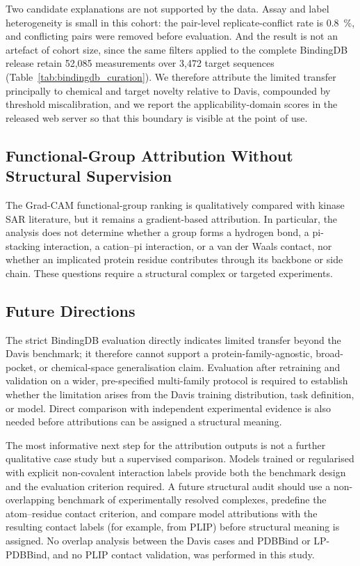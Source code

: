 \documentclass[fleqn,10pt]{wlscirep}
\begin{document}
Two candidate explanations are not supported by the data.  Assay and label
heterogeneity is small in this cohort: the pair-level replicate-conflict rate is
\SI{0.8}{\percent}, and conflicting pairs were removed before evaluation.  And
the result is not an artefact of cohort size, since the same filters applied to
the complete BindingDB release retain 52{,}085 measurements over 3{,}472 target
sequences (Table~\ref{tab:bindingdb_curation}).  We therefore attribute the
limited transfer principally to chemical and target novelty relative to Davis,
compounded by threshold miscalibration, and we report the applicability-domain
scores in the released web server so that this boundary is visible at the point
of use.

\subsection{Functional-Group Attribution Without Structural Supervision}

The Grad-CAM functional-group ranking is qualitatively compared with kinase
SAR literature, but it remains a gradient-based attribution.  In particular,
the analysis does not determine whether a group forms a hydrogen bond, a
pi-stacking interaction, a cation--pi interaction, or a van der Waals contact,
nor whether an implicated protein residue contributes through its backbone or
side chain.  These questions require a structural complex or targeted
experiments.\cite{zhang2009targeting}

\subsection{Future Directions}

The strict BindingDB evaluation directly indicates limited transfer beyond the
Davis benchmark; it therefore cannot support a protein-family-agnostic,
broad-pocket, or chemical-space generalisation claim.  Evaluation after
retraining and validation on a wider, pre-specified multi-family protocol is
required to establish whether the limitation arises from the Davis training
distribution, task definition, or model. Direct comparison with independent
experimental evidence is also needed before attributions can be assigned a
structural meaning.

The most informative next step for the attribution outputs is not a further
qualitative case study but a supervised comparison.  Models trained or
regularised with explicit non-covalent interaction labels provide both the
benchmark design and the evaluation criterion
required.\cite{li2020monn,gim2023arkdta,seo2024blendnet}  A future structural
audit should use a non-overlapping benchmark of experimentally resolved
complexes, predefine the atom--residue contact criterion, and compare model
attributions with the resulting contact labels (for example, from
PLIP\cite{salentin2015plip}) before structural meaning is assigned.  No overlap
analysis between the Davis cases and PDBBind or LP-PDBBind, and no PLIP contact
validation, was performed in this study.
\end{document}
